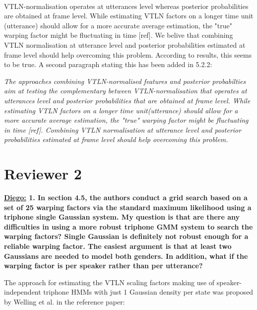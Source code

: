 \documentclass[]{article}
\begin{document}
~

VTLN-normalisation operates at utterances level whereas posterior probabilities are obtained at frame level. While estimating VTLN factors on a longer time unit (utterance) should allow for a more accurate average estimation, the "true" warping factor might be fluctuating in time [ref]. We belive that combining VTLN normalisation at utterance level and posterior probabilities estimated at frame level should help overcoming this problem. According to results, this seems to be true. A second paragraph stating this has been added in 5.2.2:

\textit{The approaches combining VTLN-normalised features and posterior probabilties aim at testing the complementary between VTLN-normalisation that operates at utterances level and posterior probabilities that are obtained at frame level. While estimating VTLN factors on a longer time unit(utterance) should allow for a more accurate average estimation, the "true" warping factor might be fluctuating in time [ref]. Combining VTLN normalisation at utterance level and posterior probabilities estimated at frame level should help overcoming this problem.}


\section{Reviewer 2}

\textbf{\underline{Diego:} 1. In section 4.5, the authors conduct a grid search based on a set of 25 warping factors via the standard maximum likelihood using a triphone single Gaussian system. My question is that are there any difficulties in using a more robust triphone GMM system to search the warping factors? Single Gaussian is definitely not robust enough for a reliable warping factor. The easiest argument is
that at least two Gaussians are needed to model both genders. In addition, what if the warping factor is per speaker rather than per utterance?}

The   approach  for  estimating   the  VTLN   scaling factors  making   use  of
speaker-independent  triphone  HMMs  with  just 1 Gaussian density  per  state  was
proposed by Welling et al. in the reference paper:
\begin{itemize}
\item L. Welling, S. Kanthak and  H.~Ney, ``Improved Methods for Vocal Tract                                              
Normalization}'', in Proc. of IEEE ICASSP, 1999, Vol. 2, pp. 761-764.
\end{itemize}
\end{document}
